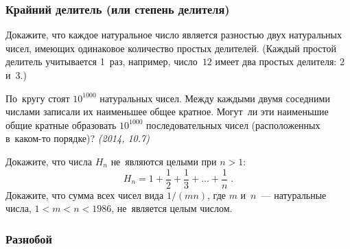 \subsubsection*{Крайний делитель (или степень делителя)}

\begin{problems}



\item
Докажите, что каждое натуральное число является разностью двух натуральных
чисел, имеющих одинаковое количество простых делителей.
(Каждый простой делитель учитывается 1~раз, например, число~$12$ имеет два
простых делителя: $2$ и~$3$.)

\item
По~кругу стоят $10^{1000}$ натуральных чисел.
Между каждыми двумя соседними числами записали их наименьшее общее кратное.
Могут~ли эти наименьшие общие кратные образовать $10^{1000}$ последовательных
чисел (расположенных в~каком-то порядке)?
\emph{(2014, 10.7)}

\item
\subproblem
Докажите, что числа $H_{n}$ не~являются целыми при $n > 1$:
\[
    H_{n}
=
    1 + \frac{1}{2} + \frac{1}{3} + \ldots + \frac{1}{n}
\;
.
\]
\subproblem
Докажите, что сумма всех чисел вида $1 / (m n)$, где $m$ и~$n$~--- натуральные
числа, $1 < m < n < 1986$, не~является целым числом.

\end{problems}


\subsubsection*{Разнобой}


